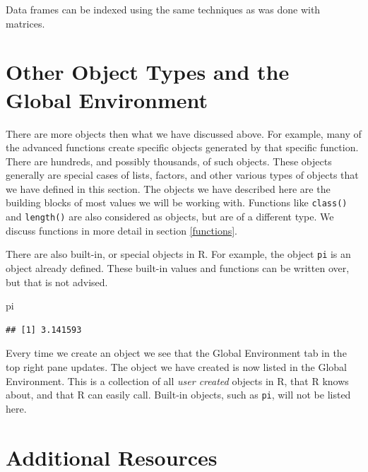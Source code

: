 \documentclass[
]{book}
\newenvironment{Shaded}{\begin{snugshade}}{\end{snugshade}}
\newcommand{\NormalTok}[1]{#1}
\begin{document}
Data frames can be indexed using the same techniques as was done with matrices.

\hypertarget{other-object-types-and-the-global-environment}{%
\section{Other Object Types and the Global Environment}\label{other-object-types-and-the-global-environment}}

There are more objects then what we have discussed above. For example, many of the advanced functions create specific objects generated by that specific function. There are hundreds, and possibly thousands, of such objects. These objects generally are special cases of lists, factors, and other various types of objects that we have defined in this section. The objects we have described here are the building blocks of most values we will be working with. Functions like \texttt{class()} and \texttt{length()} are also considered as objects, but are of a different type. We discuss functions in more detail in section \ref{functions}.

There are also built-in, or special objects in R. For example, the object \texttt{pi} is an object already defined. These built-in values and functions can be written over, but that is not advised.

\begin{Shaded}
\begin{Highlighting}[]
\NormalTok{pi}
\end{Highlighting}
\end{Shaded}

\begin{verbatim}
## [1] 3.141593
\end{verbatim}

Every time we create an object we see that the Global Environment tab in the top right pane updates. The object we have created is now listed in the Global Environment. This is a collection of all \emph{user created} objects in R, that R knows about, and that R can easily call. Built-in objects, such as \texttt{pi}, will not be listed here.

\hypertarget{additional-resources-1}{%
\section{Additional Resources}\label{additional-resources-1}}
\end{document}
